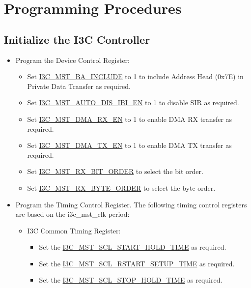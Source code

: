 \documentclass[main\_\_EN.tex]{subfiles}
\begin{document}

\section{Programming Procedures}
\label{sec:i3c-prog-procedures}
\subsection{Initialize the I3C Controller}

\begin{itemize}
    \item Program the Device Control Register:
    \begin{itemize}
        \item Set \hyperref[fielddesc:I3CMSTREGBAINCLUDE]{I3C\_MST\_BA\_INCLUDE} to 1 to include Address Head (0x7E) in Private Data Transfer as required.
        \item Set \hyperref[fielddesc:I3CMSTREGAUTODISIBIEN]{I3C\_MST\_AUTO\_DIS\_IBI\_EN} to 1 to disable SIR as required.
        \item Set \hyperref[fielddesc:I3CMSTREGDMARXEN]{I3C\_MST\_DMA\_RX\_EN} to 1 to enable DMA RX transfer as required.
        \item Set \hyperref[fielddesc:I3CMSTREGDMATXEN]{I3C\_MST\_DMA\_TX\_EN} to 1 to enable DMA TX transfer as required.
        \item Set \hyperref[fielddesc:I3CMSTREGRXBITORDER]{I3C\_MST\_RX\_BIT\_ORDER} to select the bit order.
        \item Set \hyperref[fielddesc:I3CMSTREGRXBYTEORDER]{I3C\_MST\_RX\_BYTE\_ORDER} to select the byte order.
    \end{itemize}
    \item Program the Timing Control Register. The following timing control registers are based on the i3c\_mst\_clk period:
        \begin{itemize}
          \item I3C Common Timing Register:
          \begin{itemize}
              \item Set the \hyperref[fielddesc:I3CMSTREGSCLSTARTHOLDTIME]{I3C\_MST\_SCL\_START\_HOLD\_TIME} as required.
              \item Set the \hyperref[fielddesc:I3CMSTREGSCLRSTARTSETUPTIME]{I3C\_MST\_SCL\_RSTART\_SETUP\_TIME} as required.
              \item Set the \hyperref[fielddesc:I3CMSTREGSCLSTOPHOLDTIME]{I3C\_MST\_SCL\_STOP\_HOLD\_TIME} as required.

\end{itemize}
\end{itemize}
\end{itemize}
\end{document}
